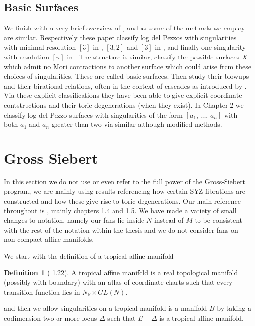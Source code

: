 \documentclass[12pt,a4paper]{book}      %
\theoremstyle{definition}
\newtheorem{dfn}[thm]{Definition}
\newcommand{\mb}[1]{\mathbb{#1}}
\begin{document}
\subsection{Basic Surfaces}
We finish with a very brief overview of \cite{CH}, \cite{Cuzz} and \cite{CP} as some of the methods we employ are similar. Respectively these paper classify log del Pezzos with singularities with minimal resolution $[3]$ in \cite{CH}, $[3,2]$ and $[3]$ in \cite{Cuzz}, and finally one singularity with resolution $[n]$ in \cite{CP}. The structure is similar, classify the possible surfaces $X$ which admit no Mori contractions to another surface which could arise from these choices of singularities. These are called basic surfaces. Then study their blowups and their birational relations, often in the context of cascades as introduced by \cite{MR2053462}. Via these explicit classifications they have been able to give explicit coordinate contstructions and their toric degenerations (when they exist). In Chapter 2 we classify log del Pezzo surfaces with singularities of the form $[a_1, \, \dots ,   \, a_n]$ with both $a_1$ and $a_n$ greater than two via similar although modified methods.


\section{Gross Siebert}\label{GrossSec}

In this section we do not use or even refer to the full power of the Gross-Siebert program, we are mainly using results referencing how certain SYZ fibrations are constructed and how these give rise to toric degenerations. Our main reference throughout is \cite{GrossBook}, mainly chapters 1.4 and 1.5. We have made a variety of small changes to notation, namely our fans lie inside $N$ instead of $M$ to be consistent with the rest of the notation within the thesis and we do not consider fans on non compact affine manifolds.

We start with the definition of a tropical affine manifold
\begin{dfn}[\cite{GrossBook} 1.22]
A tropical affine manifold is a real topological manifold (possibly with boundary) with an atlas of coordinate charts such that every transition function lies in $N_\mb{R} \rtimes GL(N)$.
\end{dfn}
and then we allow singularities on a tropical manifold is a manifold $B$ by taking a codimension two or more locus $\Delta$ such that $B-\Delta$ is a tropical affine manifold.
\end{document}
